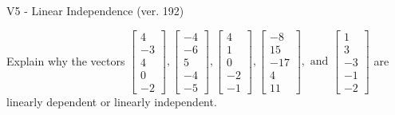 \begin{exercise}
  \begin{exerciseTitle}V5 - Linear Independence (ver. 192)\end{exerciseTitle}
  \begin{exerciseStatement}
    Explain why the vectors \(\left[\begin{array}{r}
4 \\
-3 \\
4 \\
0 \\
-2
\end{array}\right] , \left[\begin{array}{r}
-4 \\
-6 \\
5 \\
-4 \\
-5
\end{array}\right] , \left[\begin{array}{r}
4 \\
1 \\
0 \\
-2 \\
-1
\end{array}\right] , \left[\begin{array}{r}
-8 \\
15 \\
-17 \\
4 \\
11
\end{array}\right] , \text{ and } \left[\begin{array}{r}
1 \\
3 \\
-3 \\
-1 \\
-2
\end{array}\right]\) are linearly dependent or linearly independent.	



\end{exerciseStatement}
\end{exercise}
